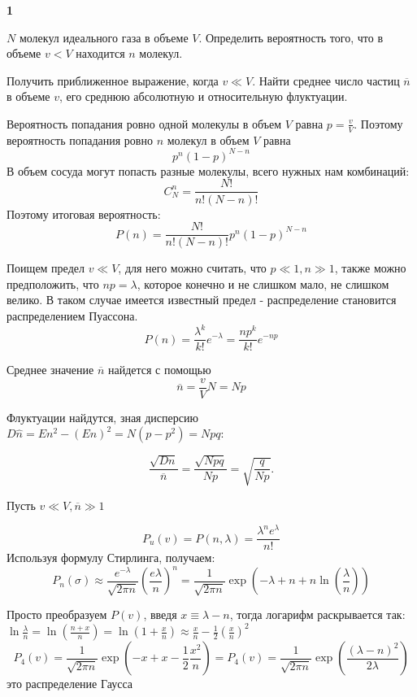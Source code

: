 \documentclass[a4paper,12pt]{article} %
\begin{document}
\begin{task}\textbf{1}

$ N $ молекул идеального газа в объеме $ V $. 
Определить вероятность того, что в объеме $v < V$ находится $ n $ молекул.

Получить приближенное выражение, когда  $v \ll V $. 
Найти среднее число частиц $\overline{n}$ в объеме $ v $, его среднюю абсолютную и относительную флуктуации.  

Вероятность попадания ровно одной молекулы в объем $ V$ равна $ p=\frac{v}{V}$. 
Поэтому вероятность попадания ровно $n$ молекул в объем $V$ равна 
\[ p^n (1-p)^{N-n} \]
В объем сосуда могут попасть разные молекулы, всего нужных нам комбинаций:
\[ C_N^n =\frac{N!}{n!(N-n)!}\]
Поэтому итоговая вероятность:
\[ P(n)=\frac{N!}{n!(N-n)!}p^n (1-p)^{N-n} \]

Поищем предел $v \ll V$,  для него можно считать, что $ p\ll 1, n\gg 1$, также можно предположить, что $ np=\lambda$, которое конечно и не слишком мало, не слишком велико.
В таком случае имеется известный предел - распределение становится распределением Пуассона.
\[ P(n)=\frac{\lambda^k}{k!}e^{-\lambda}=
\frac{np^k}{k!}e^{-np}\]

Среднее значение $\overline{n}$ найдется с помощью
\[ \overline{n}=\frac{v}{V}N=Np \]

Флуктуации найдутся, зная дисперсию $ D \hat{n}= E n^2 - (E n)^2 = N (p-p^2)=Npq $:


\[ \frac{\sqrt{D n}}{\overline{n}}=\frac{\sqrt{Npq}}{Np}=\sqrt{\frac{q}{Np}}. \]

Пусть $ v\ll V, \overline{n}\gg 1 $

$$
P_{u}(v)=P(n, \lambda)=\frac{\lambda^{n} e^{\lambda}}{n !}
$$
Используя формулу Стирлинга, получаем:
$$
P_{n}(\sigma) \approx \frac{e^{-\lambda}}{\sqrt{2 \pi n}}\left(\frac{e \lambda}{n}\right)^{n}=\frac{1}{\sqrt{2 \pi n}} 
\operatorname{exp}\left(-\lambda+n+n \ln \left(\frac{\lambda}{n}\right)\right)
$$

Просто преобразуем $ P(v)$, введя $ x\equiv \lambda -n$, тогда логарифм раскрывается так: $\ln \frac{\lambda}{n}=\ln \left(\frac{n+x}{n}\right)=\ln \left(1+\frac{x}{n}\right) \approx \frac{x}{n}-\frac{1}{2}\left(\frac{x}{n}\right)^{2}$
%
$$
P_{4}(v)=\frac{1}{\sqrt{2 \pi n}} \operatorname{exp}\left(-x+x-\frac{1}{2} \frac{x^{2}}{n}\right)=
P_{4}(v)=\frac{1}{\sqrt{2 \pi n}} \operatorname{exp}\left(\frac{(\lambda - n)^2}{2\lambda}\right)
$$
это распределение Гаусса



\end{task}
\end{document}
